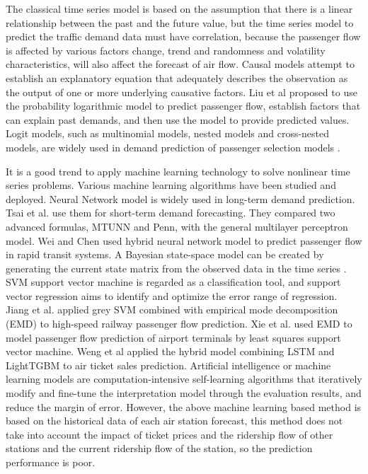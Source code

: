 \documentclass[journal,article,submit,moreauthors,pdftex]{Definitions/mdpi}
\begin{document}
\par The classical time series model is based on the assumption that there is a linear relationship between the past and the future value, but the time series model to predict the traffic demand data must have correlation, because the passenger flow is affected by various factors change, trend and randomness and volatility characteristics, will also affect the forecast of air flow. Causal models attempt to establish an explanatory equation that adequately describes the observation as the output of one or more underlying causative factors. Liu et al \cite{11} proposed to use the probability logarithmic model to predict passenger flow, establish factors that can explain past demands, and then use the model to provide predicted values. Logit models, such as multinomial models, nested models and cross-nested models, are widely used in demand prediction of passenger selection models \cite{12}.
\par It is a good trend to apply machine learning technology to solve nonlinear time series problems. Various machine learning algorithms have been studied and deployed. Neural Network model \cite{13}\cite{14} is widely used in long-term demand prediction. Tsai et al. \cite{15} use them for short-term demand forecasting. They compared two advanced formulas, MTUNN and Penn, with the general multilayer perceptron model. Wei and Chen\cite{16} used hybrid neural network model to predict passenger flow in rapid transit systems. A Bayesian state-space model can be created by generating the current state matrix from the observed data in the time series \cite{17}. SVM support vector machine is regarded as a classification tool, and support vector regression aims to identify and optimize the error range of regression. Jiang et al. \cite{18}applied grey SVM combined with empirical mode decomposition (EMD) to high-speed railway passenger flow prediction. Xie et al. \cite{19} used EMD to model passenger flow prediction of airport terminals by least squares support vector machine. Weng et al \cite{20} applied the hybrid model combining LSTM and LightTGBM to air ticket sales prediction. Artificial intelligence or machine learning models are computation-intensive self-learning algorithms that iteratively modify and fine-tune the interpretation model through the evaluation results, and reduce the margin of error. However, the above machine learning based method is based on the historical data of each air station forecast, this method does not take into account the impact of ticket prices and the ridership flow of other stations and the current ridership flow of the station, so the prediction performance is poor.
\end{document}
